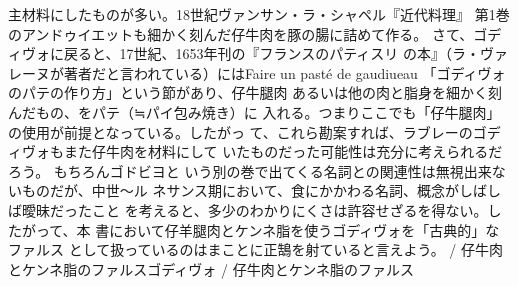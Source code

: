 {{{{  主材料にしたものが多い。18世紀ヴァンサン・ラ・シャペル『近代料理』
  第1巻のアンドゥイエットも細かく刻んだ仔牛肉を豚の腸に詰めて作る。
  さて、ゴディヴォに戻ると、17世紀、1653年刊の『フランスのパティスリ
  の本』（ラ・ヴァレーヌが著者だと言われている）にはFaire un pasté de
  gaudiueau 「ゴディヴォのパテの作り方」という節があり、仔牛腿肉
  あるいは他の肉と脂身を細かく刻んだもの、をパテ（≒パイ包み焼き）に
  入れる。つまりここでも「仔牛腿肉」の使用が前提となっている。したがっ
  て、これら勘案すれば、ラブレーのゴディヴォもまた仔牛肉を材料にして
  いたものだった可能性は充分に考えられるだろう。 もちろんゴドビヨと
  いう別の巻で出てくる名詞との関連性は無視出来ないものだが、中世〜ル
  ネサンス期において、食にかかわる名詞、概念がしばしば曖昧だったこと
  を考えると、多少のわかりにくさは許容せざるを得ない。したがって、本
  書において仔羊腿肉とケンネ脂を使うゴディヴォを「古典的」なファルス
  として扱っているのはまことに正鵠を射ていると言えよう。} /
仔牛肉とケンネ脂のファルス}{ゴディヴォ / 仔牛肉とケンネ脂のファルス}}\label{godiveau}}

\vspace*{1\zw}

